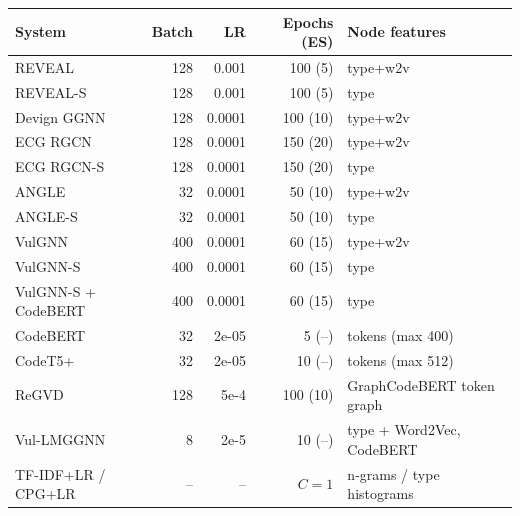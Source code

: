 \begin{tabular}{lrrrl}
\toprule
System & Batch & LR & Epochs (ES) & Node features \\
\midrule
REVEAL & 128 & 0.001 & 100 (5) & type+w2v \\
REVEAL-S & 128 & 0.001 & 100 (5) & type \\
Devign GGNN & 128 & 0.0001 & 100 (10) & type+w2v \\
ECG RGCN & 128 & 0.0001 & 150 (20) & type+w2v \\
ECG RGCN-S & 128 & 0.0001 & 150 (20) & type \\
ANGLE & 32 & 0.0001 & 50 (10) & type+w2v \\
ANGLE-S & 32 & 0.0001 & 50 (10) & type \\
VulGNN & 400 & 0.0001 & 60 (15) & type+w2v \\
VulGNN-S & 400 & 0.0001 & 60 (15) & type \\
VulGNN-S + CodeBERT & 400 & 0.0001 & 60 (15) & type \\
CodeBERT & 32 & 2e-05 & 5 (--) & tokens (max 400) \\
CodeT5+ & 32 & 2e-05 & 10 (--) & tokens (max 512) \\
ReGVD & 128 & 5e-4 & 100 (10) & GraphCodeBERT token graph \\
Vul-LMGGNN & 8 & 2e-5 & 10 (--) & type + Word2Vec, CodeBERT \\
TF-IDF+LR / CPG+LR & -- & -- & $C=1$ & n-grams / type histograms \\
\bottomrule
\end{tabular}
